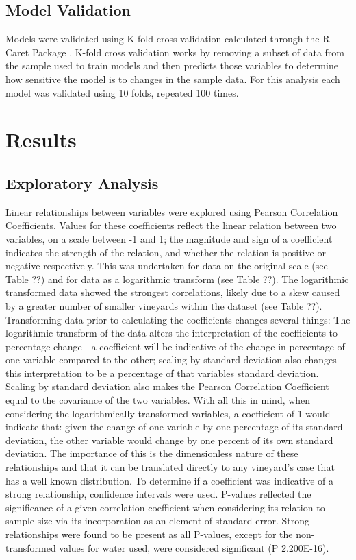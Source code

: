 \documentclass[review,12pt,authoryear]{elsarticle}
\begin{document}
\begin{linenumbers}
\subsection{Model Validation}
Models were validated using K-fold cross validation calculated through the R Caret Package \citep{kuhnBuildingPredictiveModels2008}. K-fold cross validation works by removing a subset of data from the sample used to train models and then predicts those variables to determine how sensitive the model is to changes in the sample data. For this analysis each model was validated using 10 folds, repeated 100 times.
\section{Results}
\subsection{Exploratory Analysis} \label{sec:exp_anal}
Linear relationships between variables were explored using Pearson Correlation Coefficients. Values for these coefficients reflect the linear relation between two variables, on a scale between -1 and 1; the magnitude and sign of a coefficient indicates the strength of the relation, and whether the relation is positive or negative respectively. This was undertaken for data on the original scale (see Table ??) and for data as a logarithmic transform (see Table ??). The logarithmic transformed data showed the strongest correlations, likely due to a skew caused by a greater number of smaller vineyards within the dataset (see Table ??). Transforming data prior to calculating the coefficients changes several things: The logarithmic transform of the data alters the interpretation of the coefficients to percentage change - a coefficient will be indicative of the change in percentage of one variable compared to the other; scaling by standard deviation also changes this interpretation to be a percentage of that variables standard deviation. Scaling by standard deviation also makes the Pearson Correlation Coefficient equal to the covariance of the two variables. With all this in mind, when considering the logarithmically transformed variables, a coefficient of 1 would indicate that: given the change of one variable by one percentage of its standard deviation, the other variable would change by one percent of its own standard deviation. The importance of this is the dimensionless nature of these relationships and that it can be translated directly to any vineyard's case that has a well known distribution.
\newline
To determine if a coefficient was indicative of a strong relationship, confidence intervals were used. P-values reflected the significance of a given correlation coefficient when considering its relation to sample size via its incorporation as an element of standard error. Strong relationships were found to be present as all P-values, except for the non-transformed values for water used, were considered significant (P \< 2.200E-16).

\end{linenumbers}
\end{document}
